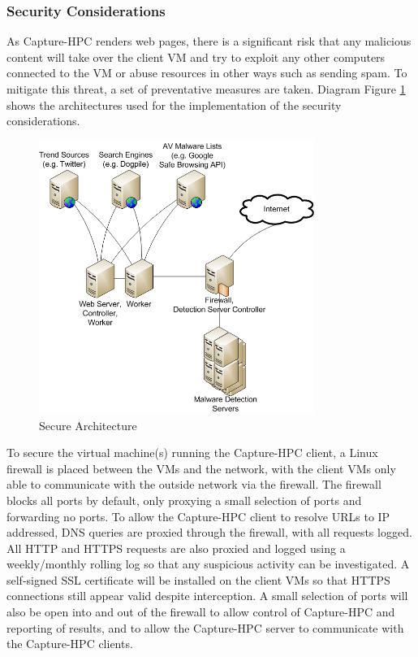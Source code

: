 \subsubsection{Security Considerations}

As Capture-HPC renders web pages, there is a significant risk that any malicious
content will take over the client VM and try to exploit any other computers
connected to the VM or abuse resources in other ways such as sending spam.
To mitigate this threat, a set of preventative measures are taken. Diagram 
Figure \ref{fig:sec-1} shows the architectures used for the implementation of the security
considerations.

\begin{figure}[htb]
\centering
\includegraphics[width=0.8\textwidth]{img/physical-arch-pres.png}
\caption{Secure Architecture}
\label{fig:sec-1}
\end{figure}

To secure the virtual machine(s) running the Capture-HPC client, a Linux
firewall is placed between the VMs and the network, with the client VMs only
able to communicate with the outside network via the firewall. The firewall
blocks all ports by default, only proxying a small selection of ports and
forwarding no ports. To allow the Capture-HPC client to resolve URLs to IP
addressed, DNS
queries are proxied through the firewall, with all requests logged. All HTTP and
HTTPS requests are also proxied and logged using a weekly/monthly rolling log
so that any suspicious
activity can be investigated. A self-signed SSL certificate will be installed on
the client VMs so that HTTPS connections still appear valid despite interception.
A small selection of ports will also be open into and out of the firewall to
allow control of Capture-HPC and reporting of results, and to allow the
Capture-HPC server to communicate with the Capture-HPC clients.

